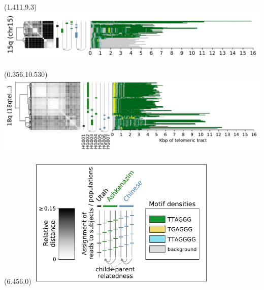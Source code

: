 \documentclass{article}
\begin{document}
\begin{textblock}{13}(1.411,9.3)\includegraphics{Figure_5/chr15.pdf}\end{textblock}
\begin{textblock}{13}(0.356,10.530)\includegraphics{Figure_5/18qtel_1-500K_1_12_12_rc.pdf}\end{textblock}
\begin{textblock}{13}(6.456,0)
\includegraphics[width=3.600in,keepaspectratio]{Figure_5/legend.pdf}
\end{textblock}
\end{document}
